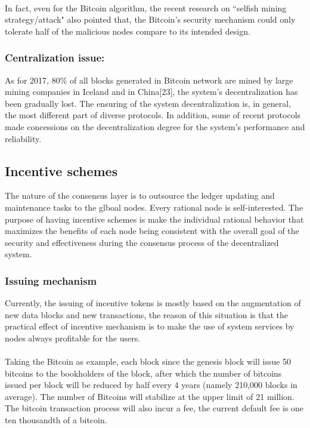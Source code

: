 \documentclass[doublespacing]{bmcart}
\begin{document}
\begin{CJK*}{UTF8}{gbsn}
\paragraph{}
	In fact, even for the Bitcoin algorithm, the recent research on ``selfish mining strategy/attack" also pointed that, the Bitcoin’s security mechanism could only tolerate half of 
the malicious nodes compare to its intended design.
\subsubsection*{Centralization issue:}
 As for 2017, 80\% of all blocks generated in Bitcoin network are mined by large mining companies in Iceland and in China[23], the system’s decentralization has been gradually lost. The ensuring of the system decentralization is, in general, the most different part of diverse protocols. In addition, some of recent protocols made concessions on the decentralization degree for the system’s performance and reliability.
\subsection{Incentive schemes}
The nature of the consensus layer is to outsource the ledger updating and maintenance tasks to the glboal nodes. Every rational node is self-interested. The purpose of having incentive schemes is make the individual rational behavior that maximizes the benefits of each node being consistent with the overall goal of the security and effectiveness during the consensus process of the decentralized system.
\subsubsection*{Issuing mechanism}
Currently, the issuing of incentive tokens is mostly based on the augmentation of new data blocks and new transactions, the reason of this situation is that the  practical effect of incentive mechanism is to make the use of system services by nodes always profitable for the users.
\paragraph{} Taking the Bitcoin as example, each block since the genesis block will issue 50 bitcoins to the bookholders of the block, after which the number of bitcoins issued per block will be reduced by half every 4 years (namely 210,000 blocks in average). The number of Bitcoins will stabilize at the upper limit of 21 million. The bitcoin transaction process will also incur a fee, the current default fee is one ten thousandth of a bitcoin.

\end{CJK*}
\end{document}
